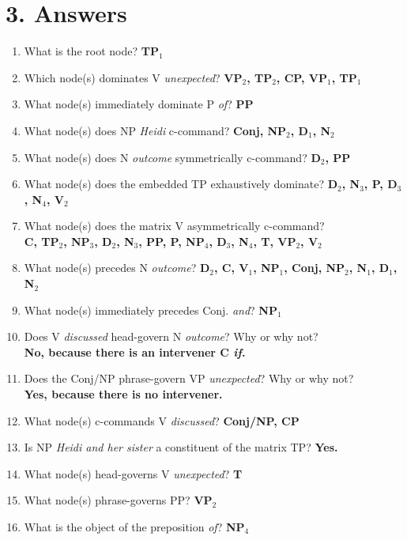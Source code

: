 \documentclass[11pt]{article}
\begin{document}
\section{3. Answers}
\bigskip
\begin{enumerate}
  \setlength{\itemsep}{1.5\itemsep}
  \item [a.] What is the root node? \quad \textbf{TP$_1$}
  \item [b.] Which node(s) dominates V \textit{unexpected}? \quad \textbf{VP$_2$, TP$_2$, CP, VP$_1$, TP$_1$} 
  \item [c.] What node(s) immediately dominate P \textit{of}? \quad \textbf{PP}
  \item [d.] What node(s) does NP \textit{Heidi} c-command? \quad \textbf{Conj, NP$_2$, D$_1$, N$_2$}
  \item [e.] What node(s) does N \textit{outcome} symmetrically c-command? \quad \textbf{D$_2$, PP}
  \item [f.] What node(s) does the embedded TP exhaustively dominate? \quad \textbf{D$_2$, N$_3$, P,  D$_3$, N$_4$, V$_2$}
  \item [g.] What node(s) does the matrix V asymmetrically c-command? \\[0.4em]
  \textbf{C, TP$_2$, NP$_3$, D$_2$, N$_3$, PP, P, NP$_4$, D$_3$, N$_4$, T, VP$_2$, V$_2$}
  \item [h.] What node(s) precedes N \textit{outcome}? \quad \textbf{D$_2$, C, V$_1$, NP$_1$, Conj, NP$_2$, N$_1$, D$_1$, N$_2$}
  \item [i.] What node(s) immediately precedes Conj. \textit{and}? \quad \textbf{NP$_1$}
  \item [j.] Does V \textit{discussed} head-govern N \textit{outcome}? Why or why not? \\[0.4em]
  \textbf{No, because there is an intervener C \textit{if}.}
  \item [k.] Does the Conj/NP phrase-govern VP \textit{unexpected}? Why or why not? \\[0.4em]
  \textbf{Yes, because there is no intervener.}
  \item [l.] What node(s) c-commands V \textit{discussed}? \quad \textbf{Conj/NP, CP}
  \item [m.] Is NP \textit{Heidi and her sister} a constituent of the matrix TP? \quad \textbf{Yes.}
  \item [n.] What node(s) head-governs V \textit{unexpected}? \quad \textbf{T}
  \item [o.] What node(s) phrase-governs PP? \quad \textbf{VP$_2$}
  \item [p.] What is the object of the preposition \textit{of}? \quad \textbf{NP$_4$}
\end{enumerate}
\end{document}

